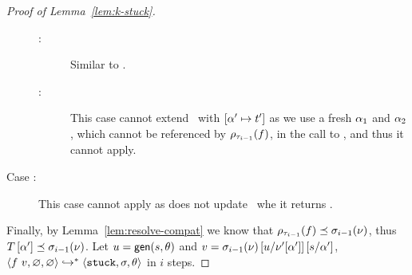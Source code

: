 \begin{proof}[Proof of Lemma~\ref{lem:k-stuck}]
\begin{description}
\begin{description}
      \item[:]
        Similar to \replusgood.
      \item[:]
        This case cannot extend \tsu\ with $[\thole' \mapsto t']$ as we
        use a fresh $\thole_1$ and $\thole_2$, which cannot be
        referenced by $\ptype{\trace_{i-1}}{f}$, in the call to
        \forcesym, and thus it cannot apply.
      \end{description}
    \item[Case \repcasebad:]
      This case cannot apply as \forcesym does not update \tsu\ whe
      it returns \stuck.
    \end{description}
  Finally, by Lemma~\ref{lem:resolve-compat} we know that
  $\vsub{\ptype{\trace_{i-1}}{f}}{\resolve{\ehole}{\vsu_{i-1}}}$,
  thus $\vsub{\intctx{\thole'}}{\resolve{\ehole}{\vsu_{i-1}}}$.
  Let $u = \gen{s}{\tsu}$
  and $v = \resolve{\ehole}{\vsu_{i-1}}\sub{\ehole'[\thole']}{u}\sub{\thole'}{s}$,
  $\steps{\eapp{f}{v}}{\emptysu}{\emptysu}{\stuck}{\vsu}{\tsu}$ in $i$ steps.




\end{proof}
